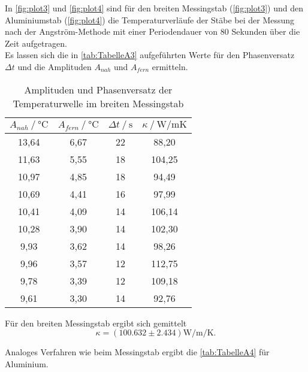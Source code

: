 In \autoref{fig:plot3} und \autoref{fig:plot4} sind für den breiten
Messingstab (\autoref{fig:plot3}) und den Aluminiumstab (\autoref{fig:plot4}) die 
Temperaturverläufe der Stäbe bei der Messung nach der Angström-Methode mit einer Periodendauer von 80 Sekunden
über die Zeit aufgetragen.\\



\noindent Es lassen sich die in \autoref{tab:TabelleA3} aufgeführten Werte für den Phasenversatz $\Delta t$ und die Amplituden $A_{nah}$ und $A_{fern}$ ermitteln.

\begin{table}[H]   
  \centering
  \caption{Amplituden und Phasenversatz der Temperaturwelle im breiten Messingstab}
  \begin{tabular}{cccc}
    \toprule
    {$A_{nah} \mathbin{/} \unit{\degreeCelsius}$} &
    {$A_{fern} \mathbin{/} \unit{\degreeCelsius}$} &    %
    {$\Delta t \mathbin{/} \unit{\second}$} &
    {$\kappa \mathbin{/} \unit{\watt / \meter\kelvin}$} \\
    \midrule
    13,64 & 6,67 & 22 & 88,20 \\   
    11,63 & 5,55 & 18 & 104,25 \\
    10,97 & 4,85 & 18 & 94,49 \\   
    10,69 & 4,41 & 16 & 97,99 \\
    10,41 & 4,09 & 14 & 106,14 \\
    10,28 & 3,90 & 14 & 102,30 \\
     9,93 & 3,62 & 14 & 98,26 \\
     9,96 & 3,57 & 12 & 112,75 \\
     9,78 & 3,39 & 12 & 109,18 \\
     9,61 & 3,30 & 14 & 92,76 \\
    
    \bottomrule
  \end{tabular}
  \label{tab:TabelleA3}
\end{table}
\noindent Für den breiten Messingstab ergibt sich gemittelt
\begin{equation*}
  \kappa = (100.632 \pm 2.434)\unit{\watt\per\meter\per\kelvin}.
\end{equation*}




\noindent Analoges Verfahren wie beim Messingstab ergibt die \autoref{tab:TabelleA4} für Aluminium.

